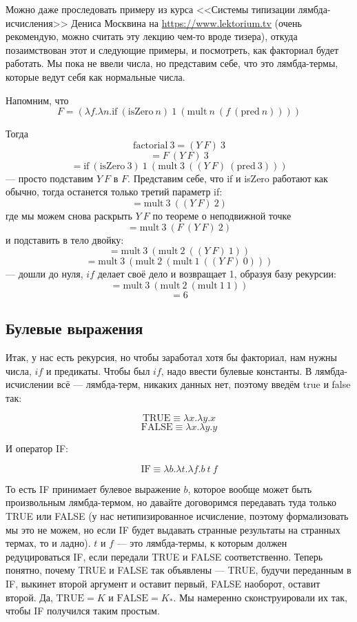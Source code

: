 \documentclass[a5paper]{article}
\begin{document}
Можно даже проследовать примеру из курса <<Системы типизации лямбда-исчисления>> Дениса Москвина на \url{https://www.lektorium.tv} (очень рекомендую, можно считать эту лекцию чем-то вроде тизера), откуда позаимствован этот и следующие примеры, и посмотреть, как факториал будет работать. Мы пока не ввели числа, но представим себе, что это лямбда-термы, которые ведут себя как нормальные числа.

Напомним, что
$$F = (\lambda f.\lambda n.\mbox{if}\ (\mbox{isZero}\ n)\ 1\ (\mbox{mult}\ n\ (f\ (\mbox{pred}\ n))))$$

Тогда
$$\mbox{factorial}\ 3 = (Y\ F)\ 3$$
$$= F\ (Y\ F)\ 3$$
$$= \mbox{if}\ (\mbox{isZero}\ 3)\ 1\ (\mbox{mult}\ 3\ ((Y\ F)\ (\mbox{pred}\ 3)))$$
--- просто подставим $Y\ F$ в $F$. Представим себе, что if и isZero работают как обычно, тогда останется только третий параметр if:
$$= \mbox{mult}\ 3\ ((Y\ F)\ 2)$$
где мы можем снова раскрыть $Y\ F$ по теореме о неподвижной точке
$$= \mbox{mult}\ 3\ (F\ (Y\ F)\ 2)$$
и подставить в тело двойку:
$$= \mbox{mult}\ 3\ (\mbox{mult}\ 2\ ((Y\ F)\ 1))$$
$$= \mbox{mult}\ 3\ (\mbox{mult}\ 2\ (\mbox{mult}\ 1\ ((Y\ F)\ 0)))$$
--- дошли до нуля, $if$ делает своё дело и возвращает 1, образуя базу рекурсии:
$$= \mbox{mult}\ 3\ (\mbox{mult}\ 2\ (\mbox{mult}\ 1\ 1))$$
$$= 6$$

\subsection{Булевые выражения}

Итак, у нас есть рекурсия, но чтобы заработал хотя бы факториал, нам нужны числа, $if$ и предикаты. Чтобы был $if$, надо ввести булевые константы. В лямбда-исчислении всё --- лямбда-терм, никаких данных нет, поэтому введём true и false так:

$$\mbox{TRUE} \equiv \lambda x.\lambda y.x$$
$$\mbox{FALSE} \equiv \lambda x.\lambda y.y$$

И оператор IF: 

$$\mbox{IF} \equiv \lambda b.\lambda t.\lambda f.b\ t\ f$$

То есть IF принимает булевое выражение $b$, которое вообще может быть произвольным лямбда-термом, но давайте договоримся передавать туда только TRUE или FALSE (у нас нетипизированное исчисление, поэтому формализовать мы это не можем, но если IF будет выдавать странные результаты на странных термах, то и ладно). $t$ и $f$ --- это лямбда-термы, к которым должен редуцироваться IF, если передали TRUE и FALSE соответственно. Теперь понятно, почему TRUE и FALSE так объявлены --- TRUE, будучи переданным в IF, выкинет второй аргумент и оставит первый, FALSE наоборот, оставит второй. Да, $\mbox{TRUE} = K$ и $\mbox{FALSE} = K_\ast$. Мы намеренно сконструировали их так, чтобы IF получился таким простым.
\end{document}

